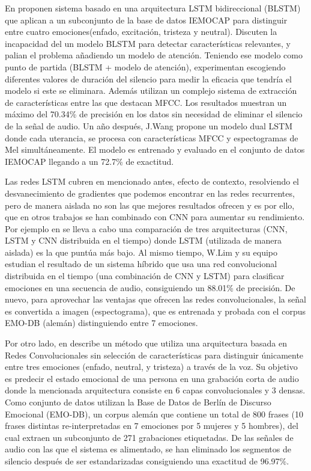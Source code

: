 \documentclass[11pt,a4paper,spanish]{book}
\begin{document}
	En \cite{Atmaja2019} proponen sistema basado en una arquitectura LSTM bidireccional (BLSTM) que aplican a un subconjunto de la base de datos IEMOCAP para distinguir entre cuatro emociones(enfado, excitación, tristeza y neutral). Discuten la incapacidad del un modelo BLSTM para detectar características relevantes, y palian el problema añadiendo un modelo de atención. Teniendo ese modelo como punto de partida (BLSTM + modelo de atención), experimentan escogiendo diferentes valores de duración del silencio para medir la eficacia que tendría el modelo si este se eliminara. Además utilizan un complejo sistema de extracción de características entre las que destacan MFCC. Los resultados muestran un máximo del 70.34\% de precisión en los datos sin necesidad de eliminar el silencio de la señal de audio.
	Un año después, J.Wang \cite{Wang2020} propone un modelo dual LSTM donde cada uterancia, se procesa con características MFCC y espectogramas de Mel simultáneamente. El modelo es entrenado y evaluado en el conjunto de datos IEMOCAP llegando a un 72.7\% de exactitud.
		
	Las redes LSTM cubren en mencionado antes, efecto de contexto, resolviendo el desvanecimiento de gradientes que podemos encontrar en las redes recurrentes, pero de manera aislada no son las que mejores resultados ofrecen y es por ello, que en otros trabajos se han combinado con CNN para aumentar su rendimiento. Por ejemplo en \cite{Lim2017} se lleva a cabo una comparación de tres  arquitecturas (CNN, LSTM y CNN distribuida en el tiempo) donde LSTM (utilizada de manera aislada) es la que puntúa más bajo. Al mismo tiempo, W.Lim y su equipo estudian el resultado de un sistema híbrido que usa una red convolucional distribuida en el tiempo (una combinación de CNN y LSTM) para clasificar emociones en una secuencia de audio, consiguiendo un 88.01\% de precisión. De nuevo, para aprovechar las ventajas que ofrecen las redes convolucionales, la señal es convertida a imagen (espectograma), que es entrenada y probada con el corpus EMO-DB (alemán) distinguiendo entre 7 emociones.
	
	Por otro lado, en \cite{Harar2017} describe un método que utiliza una arquitectura basada en Redes Convolucionales sin selección de características para distinguir únicamente entre tres emociones (enfado, neutral, y tristeza) a través de la voz. Su objetivo es predecir el estado emocional de una persona en una grabación corta de audio donde la mencionada arquitectura consiste en 6 capas convolucionales y 3 densas. Como conjunto de datos utilizan la Base de Datos de Berlín de Discurso Emocional (EMO-DB), un corpus alemán que contiene un total de 800 frases (10 frases distintas re-interpretadas en 7 emociones por 5 mujeres y 5 hombres), del cual extraen un subconjunto de 271 grabaciones etiquetadas. De las señales de audio con las que el sistema es alimentado, se han eliminado los segmentos de silencio después de ser estandarizadas consiguiendo una exactitud de 96.97\%.
	
\end{document}
